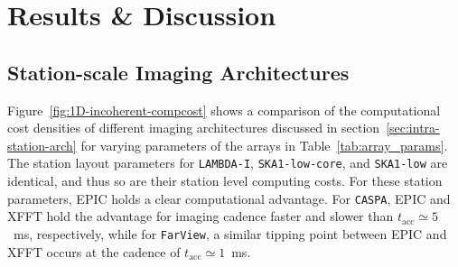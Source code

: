 \documentclass[
  journal=pasa,
  manuscript=article-type,
  year=2020,
  volume=37,
]{cup-journal}
\begin{document}




\section{Results \& Discussion} \label{sec:results}

\subsection{Station-scale Imaging Architectures}\label{sec:station-scale-imaging}

Figure~\ref{fig:1D-incoherent-compcost} shows a comparison of the computational cost densities of different imaging architectures discussed in section~\ref{sec:intra-station-arch} for varying parameters of the arrays in Table~\ref{tab:array_params}. The station layout parameters for \texttt{LAMBDA-I}, \texttt{SKA1-low-core}, and \texttt{SKA1-low} are identical, and thus so are their station level computing costs. For these station parameters, EPIC holds a clear computational advantage. For \texttt{CASPA}, EPIC and XFFT hold the advantage for imaging cadence faster and slower than $t_\textrm{acc}\simeq 5$~ms, respectively, while for \texttt{FarView}, a similar tipping point between EPIC and XFFT occurs at the cadence of $t_\textrm{acc}\simeq 1$~ms.
\end{document}
